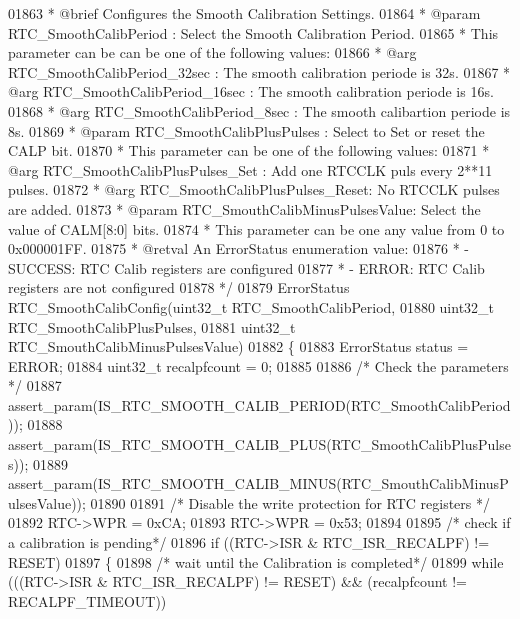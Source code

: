 \begin{DoxyCode}
01863 \textcolor{comment}{  * @brief  Configures the Smooth Calibration Settings.}
01864 \textcolor{comment}{  * @param  RTC\_SmoothCalibPeriod : Select the Smooth Calibration Period.}
01865 \textcolor{comment}{  *   This parameter can be can be one of the following values:}
01866 \textcolor{comment}{  *     @arg RTC\_SmoothCalibPeriod\_32sec : The smooth calibration periode is 32s.}
01867 \textcolor{comment}{  *     @arg RTC\_SmoothCalibPeriod\_16sec : The smooth calibration periode is 16s.}
01868 \textcolor{comment}{  *     @arg RTC\_SmoothCalibPeriod\_8sec  : The smooth calibartion periode is 8s.}
01869 \textcolor{comment}{  * @param  RTC\_SmoothCalibPlusPulses : Select to Set or reset the CALP bit.}
01870 \textcolor{comment}{  *   This parameter can be one of the following values:}
01871 \textcolor{comment}{  *     @arg RTC\_SmoothCalibPlusPulses\_Set  : Add one RTCCLK puls every 2**11 pulses.}
01872 \textcolor{comment}{  *     @arg RTC\_SmoothCalibPlusPulses\_Reset: No RTCCLK pulses are added.}
01873 \textcolor{comment}{  * @param  RTC\_SmouthCalibMinusPulsesValue: Select the value of CALM[8:0] bits.}
01874 \textcolor{comment}{  *   This parameter can be one any value from 0 to 0x000001FF.}
01875 \textcolor{comment}{  * @retval An ErrorStatus enumeration value:}
01876 \textcolor{comment}{  *          - SUCCESS: RTC Calib registers are configured}
01877 \textcolor{comment}{  *          - ERROR: RTC Calib registers are not configured}
01878 \textcolor{comment}{*/}
01879 ErrorStatus RTC_SmoothCalibConfig(uint32\_t RTC\_SmoothCalibPeriod,
01880                                   uint32\_t RTC\_SmoothCalibPlusPulses,
01881                                   uint32\_t RTC\_SmouthCalibMinusPulsesValue)
01882 \{
01883   ErrorStatus status = ERROR;
01884   uint32\_t recalpfcount = 0;
01885 
01886   \textcolor{comment}{/* Check the parameters */}
01887   assert_param(IS\_RTC\_SMOOTH\_CALIB\_PERIOD(RTC\_SmoothCalibPeriod));
01888   assert_param(IS\_RTC\_SMOOTH\_CALIB\_PLUS(RTC\_SmoothCalibPlusPulses));
01889   assert_param(IS\_RTC\_SMOOTH\_CALIB\_MINUS(RTC\_SmouthCalibMinusPulsesValue));
01890 
01891   \textcolor{comment}{/* Disable the write protection for RTC registers */}
01892   RTC->WPR = 0xCA;
01893   RTC->WPR = 0x53;
01894 
01895   \textcolor{comment}{/* check if a calibration is pending*/}
01896   \textcolor{keywordflow}{if} ((RTC->ISR & RTC_ISR_RECALPF) != RESET)
01897   \{
01898     \textcolor{comment}{/* wait until the Calibration is completed*/}
01899     \textcolor{keywordflow}{while} (((RTC->ISR & RTC_ISR_RECALPF) != RESET) && (recalpfcount != 
      RECALPF_TIMEOUT))

\end{DoxyCode}
